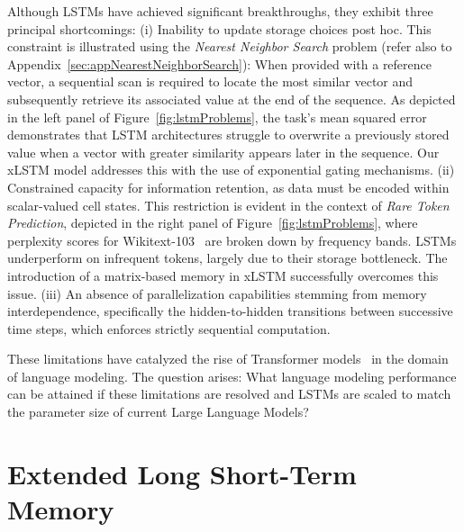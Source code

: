 Although LSTMs have achieved significant breakthroughs, they exhibit three principal shortcomings: (i) Inability to update storage choices post hoc. This constraint is illustrated using the {\it Nearest Neighbor Search} problem (refer also to Appendix~\ref{sec:appNearestNeighborSearch}): When provided with a reference vector, a sequential scan is required to locate the most similar vector and subsequently retrieve its associated value at the end of the sequence. As depicted in the left panel of Figure~\ref{fig:lstmProblems}, the task’s mean squared error demonstrates that LSTM architectures struggle to overwrite a previously stored value when a vector with greater similarity appears later in the sequence. Our xLSTM model addresses this with the use of exponential gating mechanisms. (ii) Constrained capacity for information retention, as data must be encoded within scalar-valued cell states. This restriction is evident in the context of {\it Rare Token Prediction}, depicted in the right panel of Figure~\ref{fig:lstmProblems}, where perplexity scores for Wikitext-103~\citep{Merity:17} are broken down by frequency bands. LSTMs underperform on infrequent tokens, largely due to their storage bottleneck. The introduction of a matrix-based memory in xLSTM successfully overcomes this issue. (iii) An absence of parallelization capabilities stemming from memory interdependence, specifically the hidden-to-hidden transitions between successive time steps, which enforces strictly sequential computation.

These limitations have catalyzed the rise of Transformer models~\citep{Vaswani:17} in the domain of language modeling. The question arises: What language modeling performance can be attained if these limitations are resolved and LSTMs are scaled to match the parameter size of current Large Language Models?

\section{Extended Long Short-Term Memory}
\label{sec:xLSTM}

